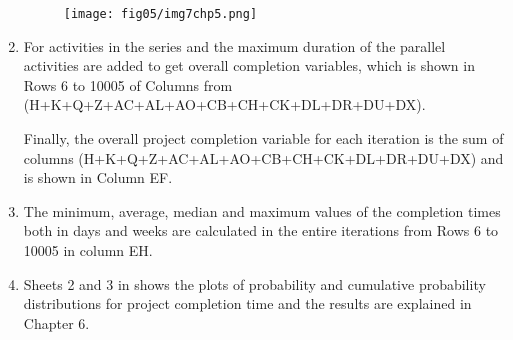 \begin{enumerate}
	\begin{figure}
		\centering
		\texttt{[image: fig05/img7chp5.png]}
		\label{im7ch5}
	\end{figure}
	

\item For activities in the series and the maximum duration of the parallel activities are added to get overall completion variables, which is shown in Rows 6 to 10005 of Columns from (H+K+Q+Z+AC+AL+AO+CB+CH+CK+DL+DR+DU+DX). 

Finally, the overall project completion variable for each iteration is the sum of columns (H+K+Q+Z+AC+AL+AO+CB+CH+CK+DL+DR+DU+DX) and is shown in Column EF.

\item The minimum, average, median and maximum values of the completion times both in days and weeks are calculated in the entire iterations from Rows 6 to 10005 in column EH.

\item Sheets 2 and 3 in \cite{Github} shows the plots of probability and cumulative probability distributions for project completion time and the results are explained in Chapter 6.

\end{enumerate}

